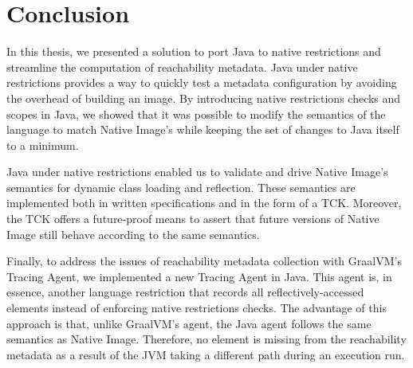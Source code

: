 \chapter{Conclusion}
% 

In this thesis, we presented a solution to port Java to native restrictions and streamline the computation of reachability metadata. 
Java under native restrictions provides a way to quickly test a metadata configuration by avoiding the overhead of building an image.
By introducing native restrictions checks and scopes in Java, we showed that it was possible to modify the semantics of the language to match Native Image's while keeping the set of changes to Java itself to a minimum.

Java under native restrictions enabled us to validate and drive Native Image's semantics for dynamic class loading and reflection. These semantics are implemented both in written specifications and in the form of a TCK. Moreover, the TCK offers a future-proof means to assert that future versions of Native Image still behave according to the same semantics. 

Finally, to address the issues of reachability metadata collection with GraalVM's Tracing Agent, we implemented a new Tracing Agent in Java. This agent is, in essence, another language restriction that records all reflectively-accessed elements instead of enforcing native restrictions checks. The advantage of this approach is that, unlike GraalVM's agent, the Java agent follows the same semantics as Native Image. Therefore, no element is missing from the reachability metadata as a result of the JVM taking a different path during an execution run. 

